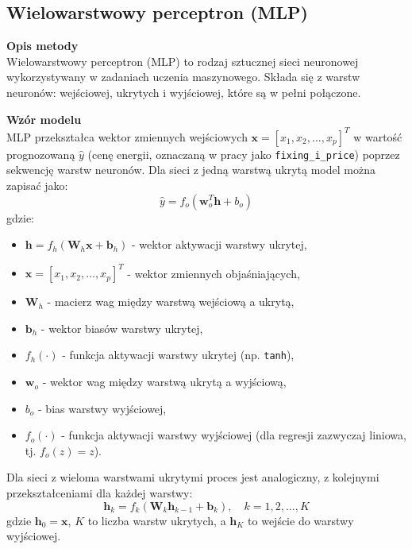 \subsection{Wielowarstwowy perceptron (MLP)}

\textbf{Opis metody} \\
Wielowarstwowy perceptron (MLP) to rodzaj sztucznej sieci neuronowej wykorzystywany w zadaniach uczenia maszynowego. Składa się z warstw neuronów: wejściowej, ukrytych i wyjściowej, które są w pełni połączone.

\textbf{Wzór modelu} \\
MLP przekształca wektor zmiennych wejściowych \( \mathbf{x} = [x_1, x_2, \dots, x_p]^T \) w wartość prognozowaną \( \hat{y} \) (cenę energii, oznaczaną w pracy jako \texttt{fixing\_i\_price}) poprzez sekwencję warstw neuronów. Dla sieci z jedną warstwą ukrytą model można zapisać jako:
\begin{equation}
\hat{y} = f_o\left( \mathbf{w}_o^T \mathbf{h} + b_o \right)
\end{equation}
gdzie:
\begin{itemize}
    \item \( \mathbf{h} = f_h\left( \mathbf{W}_h \mathbf{x} + \mathbf{b}_h \right) \) - wektor aktywacji warstwy ukrytej,
    \item \( \mathbf{x} = [x_1, x_2, \dots, x_p]^T \) - wektor zmiennych objaśniających,
    \item \( \mathbf{W}_h \) - macierz wag między warstwą wejściową a ukrytą,
    \item \( \mathbf{b}_h \) - wektor biasów warstwy ukrytej,
    \item \( f_h(\cdot) \) - funkcja aktywacji warstwy ukrytej (np. \texttt{tanh}),
    \item \( \mathbf{w}_o \) - wektor wag między warstwą ukrytą a wyjściową,
    \item \( b_o \) - bias warstwy wyjściowej,
    \item \( f_o(\cdot) \) - funkcja aktywacji warstwy wyjściowej (dla regresji zazwyczaj liniowa, tj. \( f_o(z) = z \)).
\end{itemize}

Dla sieci z wieloma warstwami ukrytymi proces jest analogiczny, z kolejnymi przekształceniami dla każdej warstwy:
\begin{equation}
\mathbf{h}_k = f_k\left( \mathbf{W}_k \mathbf{h}_{k-1} + \mathbf{b}_k \right), \quad k = 1, 2, \dots, K
\end{equation}
gdzie \( \mathbf{h}_0 = \mathbf{x} \), \( K \) to liczba warstw ukrytych, a \( \mathbf{h}_K \) to wejście do warstwy wyjściowej.

